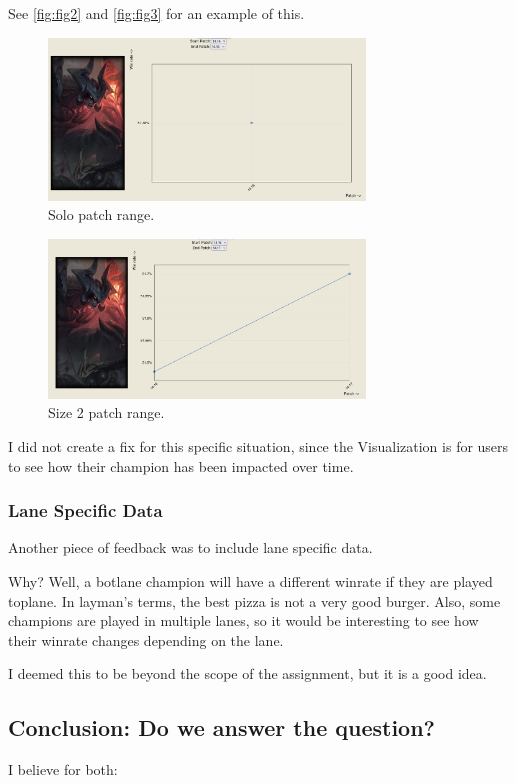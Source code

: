 \documentclass{article}
\begin{document}
See \autoref{fig:fig2} and \autoref{fig:fig3} for an example of this.

\begin{figure}[ht] 
  \centering
  \includegraphics[width=0.75\textwidth]{figs/one.jpg}
  \caption{
      Solo patch range.
  }
  \label{fig:fig2}
\end{figure}

\begin{figure}[ht] 
  \centering
  \includegraphics[width=0.75\textwidth]{figs/two.jpg}
  \caption{
      Size 2 patch range.
  }
  \label{fig:fig3}
\end{figure}

I did not create a fix for this specific situation, since the Visualization is 
for users to see how their champion has been impacted over time.

\subsubsection{Lane Specific Data}
\label{subsubsec:Lane Specific Data}

Another piece of feedback was to include lane specific data.

Why? Well, a botlane champion will have a different winrate if they are played toplane. 
In layman's terms, the best pizza is not a very good burger. 
Also, some champions are played in multiple lanes, so it would be interesting to see
how their winrate changes depending on the lane.

I deemed this to be beyond the scope of the assignment, but it is a good idea.

\subsection{Conclusion: Do we answer the question?}
\label{subsec:Conclusion}

I believe for both:


\begin{refcontext}[sorting=nyt]
\printbibliography
\end{refcontext}
\end{document}
